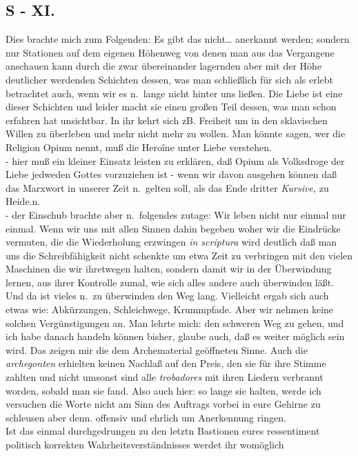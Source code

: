 \documentclass[
]{article}
\author{}
\date{\vspace{-2.5em}}
\begin{document}
\subsection{S - XI.}\label{s---xi.}

Dies brachte mich zum Folgenden: Es gibt das nicht\ldots{} anerkannt
werden; sondern nur Stationen auf dem eigenen Höhenweg von denen man aus
das Vergangene anschauen kann durch die zwar übereinander lagernden aber
mit der Höhe deutlicher werdenden Schichten dessen, was man schließlich
für sich als erlebt betrachtet auch, wenn wir es n.~lange nicht hinter
uns ließen. Die Liebe ist eine dieser Schichten und leider macht sie
einen großen Teil dessen, was man schon erfahren hat unsichtbar. In ihr
kehrt sich zB. Freiheit um in den sklavischen Willen zu überleben und
mehr nicht mehr zu wollen. Man könnte sagen, wer die Religion Opium
nennt, muß die Heroîne unter Liebe verstehen.\\
- hier muß ein kleiner Einsatz leisten zu erklären, daß Opium als
Volksdroge der Liebe jedweden Gottes vorzuziehen ist - wenn wir davon
ausgehen können daß das Marxwort in unserer Zeit n.~gelten soll, als das
Ende dritter \emph{Kursive, }zu Heide.n.\\
- der Einschub brachte aber n.~folgendes zutage: Wir leben nicht nur
einmal nur einmal. Wenn wir uns mit allen Sinnen dahin begeben woher wir
die Eindrücke vermuten, die die Wiederholung erzwingen \emph{in
scriptura} wird deutlich daß man uns die Schreibfähigkeit nicht schenkte
um etwa Zeit zu verbringen mit den vielen Maschinen die wir ihretwegen
halten, sondern damit wir in der Überwindung lernen, aus ihrer Kontrolle
zumal, wie sich alles andere auch überwinden läßt. Und da ist vieles
n.~zu überwinden den Weg lang. Vielleicht ergab sich auch etwas wie:
Abkürzungen, Schleichwege, Krummpfade. Aber wir nehmen keine solchen
Vergünstigungen an. Man lehrte mich: den schweren Weg zu gehen, und ich
habe danach handeln können bisher, glaube auch, daß es weiter möglich
sein wird. Das zeigen mir die dem Archematerial geöffneten Sinne. Auch
die \emph{archegonten} erhielten keinen Nachlaß auf den Preis, den sie
für ihre Stimme zahlten und nicht umsonst sind alle \emph{trobadores}
mit ihren Liedern verbrannt worden, sobald man sie fand. Also auch hier:
so lange sie halten, werde ich versuchen die Worte nicht am Sinn des
Auftrags vorbei in eure Gehirne zu schleusen aber denn. offensiv und
ehrlich um Anerkennung ringen.\\
Ist das einmal durchgedrungen zu den letztn Bastionen eures ressentiment
politisch korrekten Wahrheitsverständnisses werdet ihr womöglich
\end{document}
